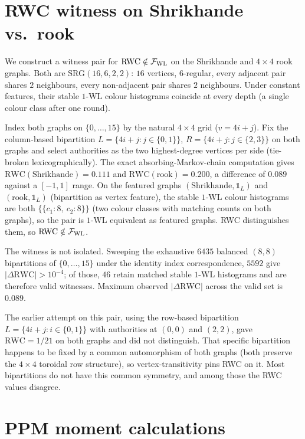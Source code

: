 \section{RWC witness on Shrikhande vs.~rook}\label{app:rwc}

We construct a witness pair for
$\mathrm{RWC} \notin \mathcal{F}_{\mathrm{WL}}$ on the Shrikhande and
$4{\times}4$ rook graphs. Both are SRG$(16, 6, 2, 2)$:
$16$ vertices, $6$-regular, every adjacent pair shares $2$
neighbours, every non-adjacent pair shares $2$ neighbours. Under
constant features, their stable $1$-WL colour histograms coincide
at every depth (a single colour class after one round).

Index both graphs on $\{0, \ldots, 15\}$ by the natural
$4{\times}4$ grid ($v = 4i + j$). Fix the column-based
bipartition
$L = \{4i + j : j \in \{0, 1\}\}$,
$R = \{4i + j : j \in \{2, 3\}\}$
on both graphs and select authorities as the two
highest-degree vertices per side (tie-broken lexicographically).
The exact absorbing-Markov-chain computation gives
$\mathrm{RWC}(\text{Shrikhande}) = 0.111$ and
$\mathrm{RWC}(\text{rook}) = 0.200$, a difference of $0.089$
against a $[-1, 1]$ range. On the featured graphs
$(\text{Shrikhande}, \mathbb{1}_L)$ and
$(\text{rook}, \mathbb{1}_L)$ (bipartition as vertex feature),
the stable $1$-WL colour histograms are both
$\{\!\!\{ c_1 : 8,\ c_2 : 8 \}\!\!\}$ (two colour classes with
matching counts on both graphs), so the pair is $1$-WL
equivalent as featured graphs. RWC distinguishes them, so
$\mathrm{RWC} \notin \mathcal{F}_{\mathrm{WL}}$.

The witness is not isolated. Sweeping the exhaustive $6435$
balanced $(8, 8)$ bipartitions of $\{0, \ldots, 15\}$ under the
identity index correspondence, $5592$ give
$|\Delta \mathrm{RWC}| > 10^{-4}$; of those, $46$ retain
matched stable $1$-WL histograms and are therefore valid
witnesses. Maximum observed $|\Delta \mathrm{RWC}|$ across the
valid set is $0.089$.

The earlier attempt on this pair, using the row-based bipartition
$L = \{4i + j : i \in \{0, 1\}\}$ with authorities at $(0, 0)$
and $(2, 2)$, gave $\mathrm{RWC} = 1/21$ on both graphs and did
not distinguish. That specific bipartition happens to be
fixed by a common automorphism of both graphs (both preserve the
$4{\times}4$ toroidal row structure), so vertex-transitivity
pins RWC on it. Most bipartitions do not have this common
symmetry, and among those the RWC values disagree.

\section{PPM moment calculations}\label{app:ppm}

